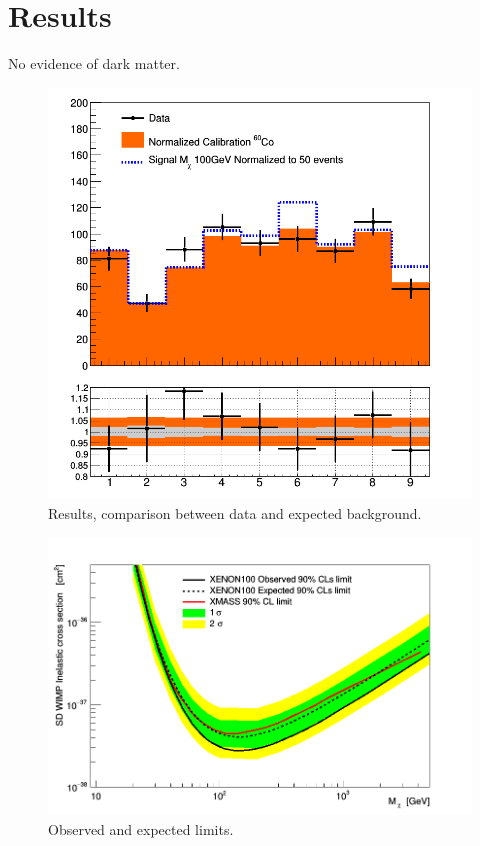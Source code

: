 \section{Results}
No evidence of dark matter.

\begin{figure}[h]
  \includegraphics[width=\linewidth]{images/data_vs_bkg.png}
  \caption{Results, comparison between data and expected background.}
  \label{fig:dataVSbkg}
\end{figure}

\begin{figure}[h!]
  \includegraphics[width=\linewidth]{images/limit_reb.png}
  \caption{Observed and expected limits.}
  \label{fig:limits}
\end{figure}



